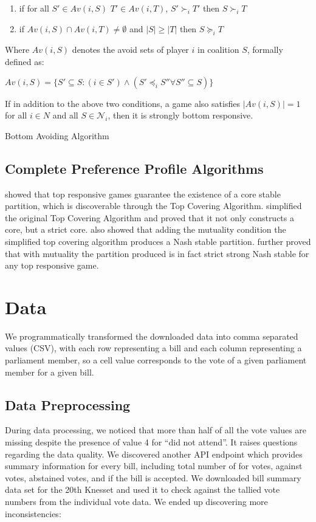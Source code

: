 \begin{enumerate}
  \item if for all $S' \in Av(i, S)$ $T' \in Av(i, T)$, $ S' \succ_i T'$ then $S \succ_i T$
  \item if $Av(i, S) \cap Av(i, T) \neq \emptyset$ and $|S| \geq |T|$ then $S \succeq_i T$
\end{enumerate}

Where $Av(i, S)$ denotes the avoid sets of player $i$ in coalition $S$, formally defined as:

$Av(i, S) = \{S' \subseteq S: (i \in S') \wedge (S' \preceq_i S'' \forall S'' \subseteq S)\}$

If in addition to the above two conditions, a game also satisfies $|Av(i, S)| = 1$ for all $i \in N$ and all $S \in \mathcal{N}_i$, then it is strongly bottom responsive.


Bottom Avoiding Algorithm

\subsection{Complete Preference Profile Algorithms} \label{section:top_covering}

 showed that top responsive games guarantee the existence of a core stable partition, which is discoverable through the Top Covering Algorithm.  simplified the original Top Covering Algorithm and proved that it not only constructs a core, but a strict core.  also showed that adding the mutuality condition the simplified top covering algorithm produces a Nash stable partition.  further proved that with mutuality the partition produced is in fact strict strong Nash stable for any top responsive game.

\section{Data}
We programmatically transformed the downloaded data into comma separated values (CSV), with each row representing a bill and each column representing a parliament member, so a cell value corresponds to the vote of a given parliament member for a given bill.

\subsection{Data Preprocessing}
During data processing, we noticed that more than half of all the vote values are missing despite the presence of value 4 for ``did not attend''. 
It raises questions regarding the data quality. We discovered another API endpoint which provides summary information for every bill, including total number of for votes, against votes, abstained votes, and if the bill is accepted. We downloaded bill summary data set for the 20th Knesset and used it to check against the tallied vote numbers from the individual vote data. We ended up discovering more inconsistencies:

